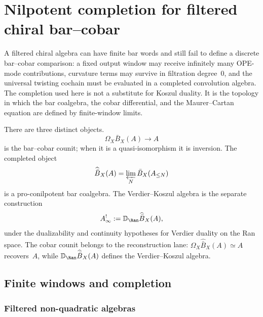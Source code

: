 
\providecommand{\bk}{\mathbb{k}}
\chapter{Nilpotent completion for filtered chiral bar--cobar}
\label{app:nilpotent-completion}


A filtered chiral algebra can have finite bar words and still fail to
define a discrete bar--cobar comparison: a fixed output window may
receive infinitely many OPE-mode contributions, curvature terms may
survive in filtration degree~$0$, and the universal twisting
cochain must be evaluated in a completed convolution algebra.  The
completion used here is not a substitute for Koszul duality.  It is the
topology in which the bar coalgebra, the cobar differential, and the
Maurer--Cartan equation are defined by finite-window limits.

\begin{remark}
\label{rem:nilpotent-completion-dependency}
There are three distinct objects.
\[
\Omega_X\bar B_X(A)\longrightarrow A
\]
is the bar--cobar counit; when it is a quasi-isomorphism it is
inversion.  The completed object
\[
\widehat{\bar B}_X(A)=\varprojlim_N \bar B_X(A_{\le N})
\]
is a pro-conilpotent bar coalgebra.  The Verdier--Koszul algebra is the
separate construction
\[
A^!_\infty:=\mathbb D_{\Ran}\widehat{\bar B}_X(A),
\]
under the dualizability and continuity hypotheses for Verdier duality
on the Ran space.  The cobar counit belongs to the reconstruction lane:
$\Omega_X\widehat{\bar B}_X(A)\simeq A$ recovers~$A$, while
$\mathbb D_{\Ran}\widehat{\bar B}_X(A)$ defines the Verdier--Koszul
algebra.
\end{remark}

\section{Finite windows and completion}

\subsection{Filtered non-quadratic algebras}

